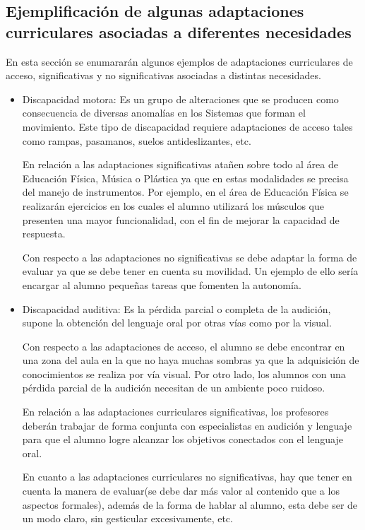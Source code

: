 \subsection{Ejemplificación de algunas adaptaciones curriculares asociadas a diferentes necesidades }

En esta sección se enumararán algunos ejemplos de adaptaciones curriculares de acceso, significativas y no significativas asociadas a distintas necesidades.

\begin{itemize}
    \item Discapacidad motora: Es un grupo de alteraciones que se producen como consecuencia de diversas anomalías en los Sistemas que forman el movimiento. Este tipo de discapacidad requiere  adaptaciones de acceso tales como rampas, pasamanos, suelos antideslizantes, etc.

          En relación a las adaptaciones significativas atañen sobre todo al área de Educación Física, Música o Plástica ya que en estas modalidades se precisa del manejo de instrumentos. Por ejemplo, en el área de Educación Física se realizarán ejercicios en los cuales el alumno utilizará los músculos que presenten una mayor funcionalidad, con el fin de mejorar la capacidad de respuesta.

          Con respecto a las adaptaciones no significativas se debe adaptar la forma de evaluar ya que se debe tener en cuenta su movilidad. Un ejemplo de ello sería encargar al alumno pequeñas tareas que fomenten la autonomía.

    \item Discapacidad auditiva: Es la pérdida parcial o completa de la audición, supone la obtención del lenguaje oral por otras vías como por la visual.

          Con respecto a las adaptaciones de acceso, el alumno se debe encontrar en una zona del aula en la que no haya muchas sombras ya que la adquisición de conocimientos se realiza por vía visual. Por otro lado, los alumnos con una pérdida parcial de la audición necesitan de un ambiente poco ruidoso.

          En relación a las adaptaciones curriculares significativas, los profesores deberán trabajar de forma conjunta con especialistas en audición y lenguaje para que el alumno logre alcanzar los objetivos conectados con el lenguaje oral.

          En cuanto a las adaptaciones curriculares no significativas, hay que tener en cuenta la manera de evaluar(se debe dar más valor al contenido que a los aspectos formales), además de la forma de hablar al alumno, esta debe ser de un modo claro, sin gesticular excesivamente, etc.


\end{itemize}
